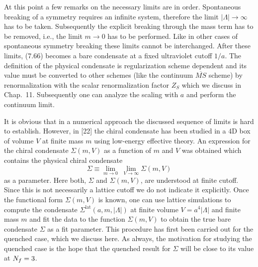 At this point a few remarks on the necessary limits are in order. Spontaneous
breaking of a symmetry requires an infinite system, therefore the limit
$|\Lambda| \to \infty$ has to be taken. Subsequently the explicit breaking
through the mass term has to be removed, i.e., the limit $m \to 0$ has to be
performed. Like in other cases of spontaneous symmetry breaking these limits
cannot be interchanged. After these limits, (7.66) becomes a bare condensate at
a fixed ultraviolet cutoff $1/a$. The definition of the physical condensate is
regularization scheme dependent and its value must be converted to other
schemes (like the continuum $\overline{MS}$ scheme) by renormalization with
the scalar renormalization factor $Z_S$ which we discuss in Chap.~11.
Subsequently one can analyze the scaling with $a$ and perform the continuum
limit.

It is obvious that in a numerical approach the discussed sequence of limits is
hard to establish. However, in [22] the chiral condensate has been studied in
a 4D box of volume $V$ at finite mass $m$ using low-energy effective theory.
An expression for the chiral condensate $\Sigma(m, V)$ as a function of $m$ and
$V$ was obtained which contains the physical chiral condensate
\begin{equation}
  \Sigma \equiv \lim_{m \to 0}\;\lim_{V \to \infty} \Sigma(m, V)
\end{equation}
as a parameter. Here both, $\Sigma$ and $\Sigma(m, V)$, are understood at
finite cutoff. Since this is not necessarily a lattice cutoff we do not
indicate it explicitly. Once the functional form $\Sigma(m, V)$ is known, one
can use lattice simulations to compute the condensate
$\Sigma^{\mathrm{lat}}(a, m, |\Lambda|)$ at finite volume $V = a^4|\Lambda|$
and finite mass $m$ and fit the data to the function $\Sigma(m, V)$ to obtain
the true bare condensate $\Sigma$ as a fit parameter. This procedure has first
been carried out for the quenched case, which we discuss here. As always, the
motivation for studying the quenched case is the hope that the quenched result
for $\Sigma$ will be close to its value at $N_f = 3$.

